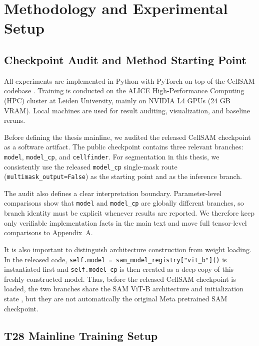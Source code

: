 \section{Methodology and Experimental Setup}\label{methodology-and-experimental-setup}

\subsection{Checkpoint Audit and Method Starting Point}\label{checkpoint-audit-and-method-starting-point}

All experiments are implemented in Python with PyTorch on top of the CellSAM codebase \cite{israel2024cellsam}. Training is conducted on the ALICE High-Performance Computing (HPC) cluster at Leiden University, mainly on NVIDIA L4 GPUs (24 GB VRAM). Local machines are used for result auditing, visualization, and baseline reruns.

Before defining the thesis mainline, we audited the released CellSAM checkpoint as a software artifact. The public checkpoint contains three relevant branches: \texttt{model}, \texttt{model\_cp}, and \texttt{cellfinder}. For segmentation in this thesis, we consistently use the released \texttt{model\_cp} single-mask route (\texttt{multimask\_output=False}) as the starting point and as the inference branch.

The audit also defines a clear interpretation boundary. Parameter-level comparisons show that \texttt{model} and \texttt{model\_cp} are globally different branches, so branch identity must be explicit whenever results are reported. We therefore keep only verifiable implementation facts in the main text and move full tensor-level comparisons to Appendix~A.

It is also important to distinguish architecture construction from weight loading. In the released code, \texttt{self.model\ =\ sam\_model\_registry{[}"vit\_b"{]}()} is instantiated first and \texttt{self.model\_cp} is then created as a deep copy of this freshly constructed model. Thus, before the released CellSAM checkpoint is loaded, the two branches share the SAM ViT-B architecture and initialization state \cite{kirillov2023sam}, but they are not automatically the original Meta pretrained SAM checkpoint.

\subsection{T28 Mainline Training Setup}\label{t28-mainline-training-setup}


